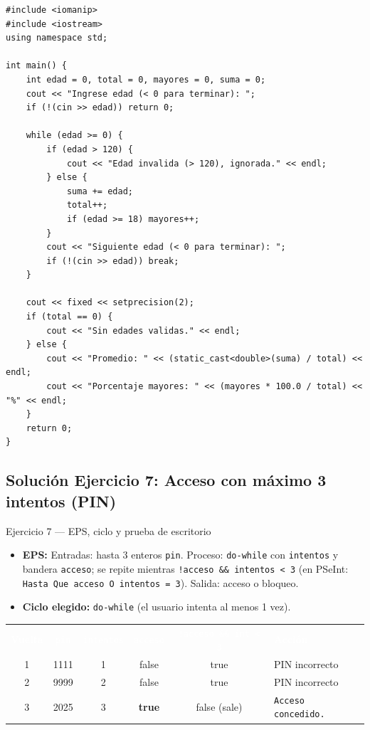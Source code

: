 \documentclass[11pt,letterpaper]{article}
\begin{document}
\begin{lstlisting}[style=cppmonitoria,caption={Solución Ejercicio 6: Censo rápido de edades (C++)}]
#include <iomanip>
#include <iostream>
using namespace std;

int main() {
    int edad = 0, total = 0, mayores = 0, suma = 0;
    cout << "Ingrese edad (< 0 para terminar): ";
    if (!(cin >> edad)) return 0;

    while (edad >= 0) {
        if (edad > 120) {
            cout << "Edad invalida (> 120), ignorada." << endl;
        } else {
            suma += edad;
            total++;
            if (edad >= 18) mayores++;
        }
        cout << "Siguiente edad (< 0 para terminar): ";
        if (!(cin >> edad)) break;
    }

    cout << fixed << setprecision(2);
    if (total == 0) {
        cout << "Sin edades validas." << endl;
    } else {
        cout << "Promedio: " << (static_cast<double>(suma) / total) << endl;
        cout << "Porcentaje mayores: " << (mayores * 100.0 / total) << "%" << endl;
    }
    return 0;
}
\end{lstlisting}

\subsection{Solución Ejercicio 7: Acceso con máximo 3 intentos (PIN)}

\begin{solucion}{Ejercicio 7 --- EPS, ciclo y prueba de escritorio}
\begin{itemize}
  \item \textbf{EPS:} Entradas: hasta 3 enteros \texttt{pin}. Proceso: \texttt{do-while} con \texttt{intentos} y bandera \texttt{acceso}; se repite mientras \texttt{!acceso \&\& intentos < 3} (en PSeInt: \texttt{Hasta Que acceso O intentos = 3}). Salida: acceso o bloqueo.
  \item \textbf{Ciclo elegido:} \texttt{do-while} (el usuario intenta al menos 1 vez).
\end{itemize}
\begin{center}
\footnotesize
\renewcommand{\arraystretch}{1.15}
\begin{tabularx}{0.9\linewidth}{c c c c c X}
\rowcolor{AzulMarino}
\textcolor{white}{\textbf{Vuelta}} & \textcolor{white}{\texttt{pin}} & \textcolor{white}{\texttt{intentos}} & \textcolor{white}{\texttt{acceso}} & \textcolor{white}{\texttt{!acceso \&\& int < 3}} & \textcolor{white}{\textbf{Acción}} \\
1 & 1111 & 1 & false & true & PIN incorrecto \\
2 & 9999 & 2 & false & true & PIN incorrecto \\
3 & 2025 & 3 & \textbf{true} & false (sale) & \texttt{Acceso concedido.} \\
\bottomrule
\end{tabularx}
\end{center}
\end{solucion}
\end{document}
